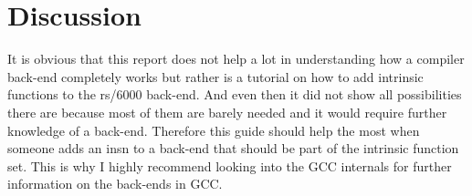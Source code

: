 \chapter{Discussion}
\label{chapter:discussion}

It is obvious that this report does not help a lot in understanding how a compiler back-end completely works but rather is a tutorial on how to add intrinsic functions to the rs/6000 back-end. And even then it did not show all possibilities there are because most of them are barely needed and it would require further knowledge of a back-end. Therefore this guide should help the most when someone adds an insn to a back-end that should be part of the intrinsic function set. This is why I highly recommend looking into the GCC internals for further information on the back-ends in GCC. 
